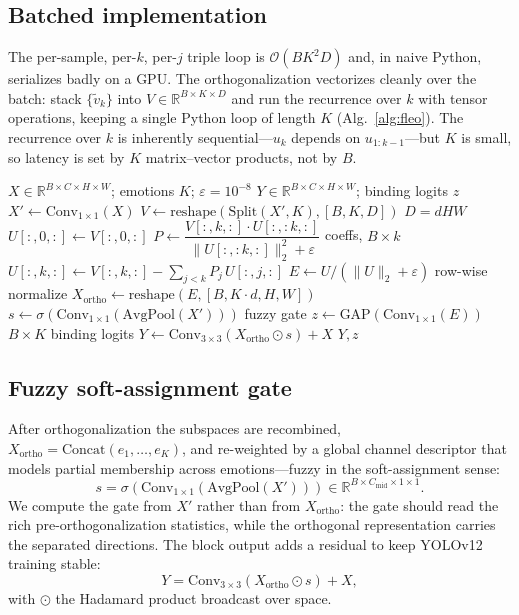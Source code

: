 \documentclass[journal]{IEEEtran}
\begin{document}
\subsection{Batched implementation}
The per-sample, per-$k$, per-$j$ triple loop is $\mathcal{O}(BK^2D)$ and, in
naive Python, serializes badly on a GPU. The orthogonalization vectorizes
cleanly over the batch: stack $\{\tilde{v}_k\}$ into
$V\in\mathbb{R}^{B\times K\times D}$ and run the recurrence over $k$ with
tensor operations, keeping a single Python loop of length $K$
(Alg.~\ref{alg:fleo}). The recurrence over $k$ is inherently
sequential---$u_k$ depends on $u_{1:k-1}$---but $K$ is small, so latency is set
by $K$ matrix--vector products, not by $B$.

\begin{algorithm}[t]
\caption{Batched FLEO forward pass}\label{alg:fleo}
\begin{algorithmic}[1]
\REQUIRE $X\in\mathbb{R}^{B\times C\times H\times W}$; emotions $K$;
$\varepsilon=10^{-8}$
\ENSURE $Y\in\mathbb{R}^{B\times C\times H\times W}$; binding logits $z$
\STATE $X' \leftarrow \text{Conv}_{1\times1}(X)$
\STATE $V \leftarrow \text{reshape}(\text{Split}(X',K),[B,K,D])$
       \hfill $D=dHW$
\STATE $U[:,0,:] \leftarrow V[:,0,:]$
  \STATE $P \leftarrow \dfrac{V[:,k,:]\cdot U[:,:k,:]}
         {\lVert U[:,:k,:]\rVert_2^2+\varepsilon}$ \hfill coeffs, $B\times k$
  \STATE $U[:,k,:] \leftarrow V[:,k,:]-\sum_{j<k}P_j\,U[:,j,:]$
\ENDFOR
\STATE $E \leftarrow U/(\lVert U\rVert_2+\varepsilon)$ \hfill row-wise normalize
\STATE $X_\text{ortho} \leftarrow \text{reshape}(E,[B,K{\cdot}d,H,W])$
\STATE $s \leftarrow \sigma(\text{Conv}_{1\times1}(\text{AvgPool}(X')))$
       \hfill fuzzy gate
\STATE $z \leftarrow \text{GAP}(\text{Conv}_{1\times1}(E))$
       \hfill $B\times K$ binding logits
\STATE $Y \leftarrow \text{Conv}_{3\times3}(X_\text{ortho}\odot s)+X$
\RETURN $Y, z$
\end{algorithmic}
\end{algorithm}

\subsection{Fuzzy soft-assignment gate}
After orthogonalization the subspaces are recombined,
$X_\text{ortho}=\text{Concat}(e_1,\dots,e_K)$, and re-weighted by a global
channel descriptor that models partial membership across emotions---fuzzy in
the soft-assignment sense:
\begin{equation}\label{eq:gate}
s = \sigma\!\left(\text{Conv}_{1\times1}(\text{AvgPool}(X'))\right)
    \in\mathbb{R}^{B\times C_\text{mid}\times1\times1}.
\end{equation}
We compute the gate from $X'$ rather than from $X_\text{ortho}$: the gate
should read the rich pre-orthogonalization statistics, while the orthogonal
representation carries the separated directions. The block output adds a
residual to keep YOLOv12 training stable:
\begin{equation}
Y = \text{Conv}_{3\times3}(X_\text{ortho}\odot s)+X,
\end{equation}
with $\odot$ the Hadamard product broadcast over space.
\end{document}
